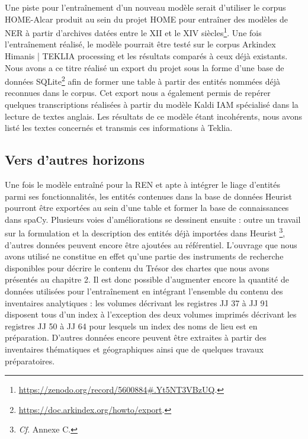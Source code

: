\documentclass[a4paper,12pt,twoside]{book}
\begin{document}
	Une piste pour l'entraînement d'un nouveau modèle serait d'utiliser le corpus HOME-Alcar produit au sein du projet HOME  pour entraîner des modèles de NER à partir d'archives datées entre le XII\ieme{} et le XIV\ieme{} siècles\footnote{\url{https://zenodo.org/record/5600884\#.Yt5NT3VBzUQ}.}. Une fois l'entraînement réalisé, le modèle pourrait être testé sur le corpus Arkindex \og Himanis | TEKLIA processing\fg{} et les résultats comparés à ceux déjà existants. Nous avons a ce titre réalisé un export du projet sous la forme d'une base de données SQLite\footnote{\url{https://doc.arkindex.org/howto/export}.} afin de former une table à partir des entités nommées déjà reconnues dans le corpus. Cet export nous a également permis de repérer quelques transcriptions réalisées à partir du modèle \og Kaldi IAM\fg{} spécialisé dans la lecture de textes anglais. Les résultats de ce modèle étant incohérents, nous avons listé les textes concernés et transmis ces informations à Teklia.
	
	\subsection{Vers d'autres horizons}
	
	Une fois le modèle entraîné pour la REN et apte à intégrer le liage d'entités parmi ses fonctionnalités, les entités contenues dans la base de données Heurist pourront être exportées au sein d'une table et former la base de connaissances dans spaCy. Plusieurs voies d'améliorations se dessinent ensuite : outre un travail sur la formulation et la description des entités déjà importées dans Heurist \footnote{\textit{Cf}. Annexe C.}, d'autres données peuvent encore être ajoutées au référentiel. L'ouvrage que nous avons utilisé ne constitue en effet qu'une partie des instruments de recherche disponibles pour décrire le contenu du Trésor des chartes que nous avons présentés au chapitre 2. Il est donc possible d'augmenter encore la quantité de données utilisées pour l'entraînement en intégrant l'ensemble du contenu des inventaires analytiques : les volumes décrivant les registres JJ 37 à JJ 91 disposent tous d'un index à l'exception des deux volumes imprimés décrivant les registres JJ 50 à JJ 64 pour lesquels un index des noms de lieu est en préparation. D'autres données encore peuvent être extraites à partir des inventaires thématiques et géographiques ainsi que de quelques travaux préparatoires. 
	
\end{document}
